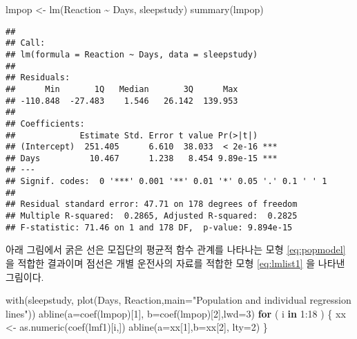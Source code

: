 \documentclass[
]{book}
\newenvironment{Shaded}{\begin{snugshade}}{\end{snugshade}}
\newcommand{\AttributeTok}[1]{\textcolor[rgb]{0.77,0.63,0.00}{#1}}
\newcommand{\ControlFlowTok}[1]{\textcolor[rgb]{0.13,0.29,0.53}{\textbf{#1}}}
\newcommand{\DecValTok}[1]{\textcolor[rgb]{0.00,0.00,0.81}{#1}}
\newcommand{\FunctionTok}[1]{\textcolor[rgb]{0.00,0.00,0.00}{#1}}
\newcommand{\NormalTok}[1]{#1}
\newcommand{\OtherTok}[1]{\textcolor[rgb]{0.56,0.35,0.01}{#1}}
\newcommand{\SpecialCharTok}[1]{\textcolor[rgb]{0.00,0.00,0.00}{#1}}
\newcommand{\StringTok}[1]{\textcolor[rgb]{0.31,0.60,0.02}{#1}}
\begin{document}
\begin{Shaded}
\begin{Highlighting}[]
\NormalTok{lmpop }\OtherTok{\textless{}{-}} \FunctionTok{lm}\NormalTok{(Reaction }\SpecialCharTok{\textasciitilde{}}\NormalTok{ Days, sleepstudy)}
\FunctionTok{summary}\NormalTok{(lmpop)}
\end{Highlighting}
\end{Shaded}

\begin{verbatim}
## 
## Call:
## lm(formula = Reaction ~ Days, data = sleepstudy)
## 
## Residuals:
##      Min       1Q   Median       3Q      Max 
## -110.848  -27.483    1.546   26.142  139.953 
## 
## Coefficients:
##             Estimate Std. Error t value Pr(>|t|)    
## (Intercept)  251.405      6.610  38.033  < 2e-16 ***
## Days          10.467      1.238   8.454 9.89e-15 ***
## ---
## Signif. codes:  0 '***' 0.001 '**' 0.01 '*' 0.05 '.' 0.1 ' ' 1
## 
## Residual standard error: 47.71 on 178 degrees of freedom
## Multiple R-squared:  0.2865, Adjusted R-squared:  0.2825 
## F-statistic: 71.46 on 1 and 178 DF,  p-value: 9.894e-15
\end{verbatim}

아래 그림에서 굵은 선은 모집단의 평균적 함수 관계를 나타나는 모형 \eqref{eq:popmodel}을 적합한 결과이며 점선은 개별 운전사의 자료를 적합한 모형 \eqref{eq:lmlist1} 을 나타낸 그림이다.

\begin{Shaded}
\begin{Highlighting}[]
\FunctionTok{with}\NormalTok{(sleepstudy, }\FunctionTok{plot}\NormalTok{(Days, Reaction,}\AttributeTok{main=}\StringTok{"Population and individual regression lines"}\NormalTok{))}
\FunctionTok{abline}\NormalTok{(}\AttributeTok{a=}\FunctionTok{coef}\NormalTok{(lmpop)[}\DecValTok{1}\NormalTok{], }\AttributeTok{b=}\FunctionTok{coef}\NormalTok{(lmpop)[}\DecValTok{2}\NormalTok{],}\AttributeTok{lwd=}\DecValTok{3}\NormalTok{)}
\ControlFlowTok{for}\NormalTok{ ( i }\ControlFlowTok{in} \DecValTok{1}\SpecialCharTok{:}\DecValTok{18}\NormalTok{ ) \{}
\NormalTok{  xx }\OtherTok{\textless{}{-}} \FunctionTok{as.numeric}\NormalTok{(}\FunctionTok{coef}\NormalTok{(lmf1)[i,])}
\FunctionTok{abline}\NormalTok{(}\AttributeTok{a=}\NormalTok{xx[}\DecValTok{1}\NormalTok{],}\AttributeTok{b=}\NormalTok{xx[}\DecValTok{2}\NormalTok{], }\AttributeTok{lty=}\DecValTok{2}\NormalTok{)}
\NormalTok{\}}
\end{Highlighting}
\end{Shaded}
\end{document}
